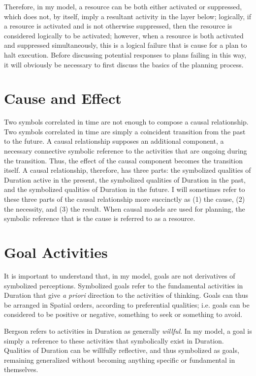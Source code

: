 Therefore, in my model, a resource can be both either activated or
suppressed, which does not, by itself, imply a resultant activity in
the layer below; logically, if a resource is activated and is not
otherwise suppressed, then the resource is considered logically to be
activated; however, when a resource is both activated and suppressed
simultaneously, this is a logical failure that is cause for a plan to
halt execution.  Before discussing potential responses to plans
failing in this way, it will obviously be necessary to first discuss
the basics of the planning process.

\section{Cause and Effect}

Two symbols correlated in time are not enough to compose a causal
relationship.  Two symbols correlated in time are simply a coincident
transition from the past to the future.  A causal relationship
supposes an additional component, a necessary connective symbolic
reference to the activities that are ongoing during the transition.
Thus, the effect of the causal component becomes the transition
itself.  A causal relationship, therefore, has three parts: the
symbolized qualities of Duration active in the present, the symbolized
qualities of Duration in the past, and the symbolized qualities of
Duration in the future.  I will sometimes refer to these three parts
of the causal relationship more succinctly as (1) the cause, (2) the
necessity, and (3) the result.  When causal models are used for
planning, the symbolic reference that is the cause is referred to as a
resource.

\section{Goal Activities}

It is important to understand that, in my model, goals are not
derivatives of symbolized perceptions.  Symbolized goals refer to the
fundamental activities in Duration that give \emph{a priori} direction
to the activities of thinking.  Goals can thus be arranged in Spatial
orders, according to preferential qualities; i.e. goals can be
considered to be positive or negative, something to seek or something
to avoid.

Bergson refers to activities in Duration as generally \emph{willful}.
In my model, a goal is simply a reference to these activities that
symbolically exist in Duration.  Qualities of Duration can be
willfully reflective, and thus symbolized as goals, remaining
generalized without becoming anything specific or fundamental in
themselves.

